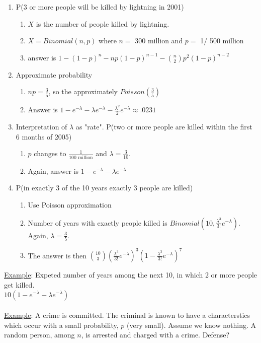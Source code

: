       \begin{enumerate}
        \item P(3 or more people will be killed by lightning in 2001)
        \begin{enumerate}
          \item $X$ is the number of people killed by lightning.
          \item $X = Binomial(n,p)$ where $n = $ 300 million and $p = $ 1/ 500
            million
          \item answer is $1 - (1 - p)^n - np(1-p)^{n-1} - \binom{n}{2}
            p^2(1-p)^{n-2}$
        \end{enumerate}
        \item Approximate probability
        \begin{enumerate}
          \item $np = \frac{3}{5}$, so the approximately $Poisson(\frac{3}{5})$
          \item Answer is $1 - e^{-\lambda} - \lambda e^{-\lambda} - 
            \frac{\lambda^2}{2} e^{-\lambda} \approx .0231$
        \end{enumerate}
        \item Interpretation of $\lambda$ as "rate". P(two or more people
          are killed within the first 6 months of 2005)
        \begin{enumerate}
          \item $p$ changes to $\frac{1}{100 \text{ million}}$ and $\lambda = 
            \frac{3}{10}$. 
          \item Again, answer is $1 - e^{-\lambda} - \lambda e^{-\lambda}$
        \end{enumerate}
        \item P(in exactly 3 of the 10 years exactly 3 people are killed)
        \begin{enumerate}
          \item Use Poisson approximation
          \item Number of years with exactly people killed is $Binomial(10,
            \frac{\lambda^3}{3!}e^{-\lambda})$. Again, $\lambda = \frac{3}{5}$.
          \item The answer is then $\binom{10}{3}(\frac{\lambda^3}{3!} 
          e^{-\lambda})^3(1 - \frac{\lambda^3}{3!}e^{-\lambda})^7$
        \end{enumerate}
      \end{enumerate}
    \underline{Example}: Expeted number of years among the next 10, in which 2
      or more people get killed.\\
      $10(1 - e^{-\lambda} - \lambda e^{-\lambda})$\\\\
    \underline{Example}: A crime is committed. The criminal is known to have a 
      characterstics which occur with a small probability, $p$ (very small).
      Assume we know nothing. A random person, among $n$, is arrested and 
      charged with a crime. Defense?

